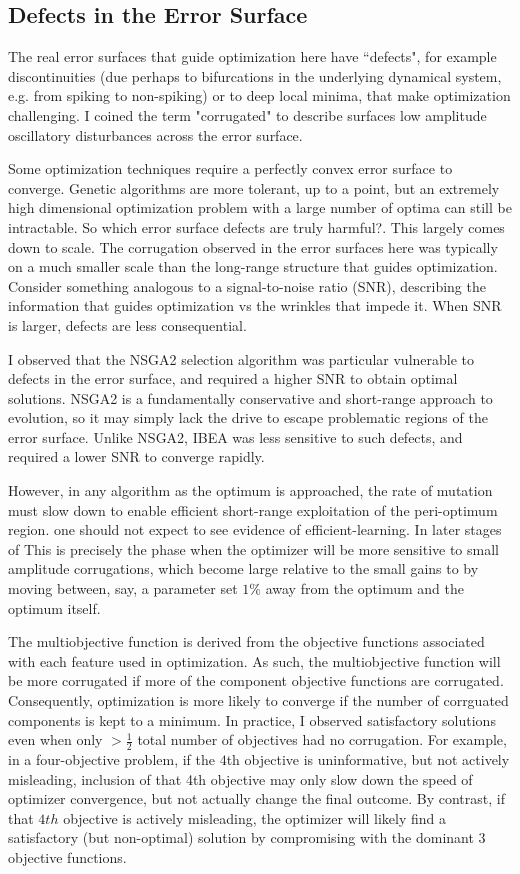 \subsection{Defects in the Error Surface}
The real error surfaces that guide optimization here have ``defects", for example discontinuities (due perhaps to bifurcations in the underlying dynamical system, e.g. from spiking to non-spiking) or to deep local minima, that make optimization challenging.
I coined the term "corrugated" to describe surfaces low amplitude oscillatory disturbances across the error surface.

Some optimization techniques require a perfectly convex error surface to converge.
Genetic algorithms are more tolerant, up to a point, but an extremely high dimensional optimization problem with a large number of optima can still be intractable.
So which error surface defects are truly harmful?.
This largely comes down to scale.
The corrugation observed in the error surfaces here was typically on a much smaller scale than the long-range structure that guides optimization.
Consider something analogous to a signal-to-noise ratio (SNR), describing the information that guides optimization vs the wrinkles that impede it.
When SNR is larger, defects are less consequential.

I observed that the NSGA2 selection algorithm was particular vulnerable to defects in the error surface, and required a higher SNR to obtain optimal solutions.
NSGA2 is a fundamentally conservative and short-range approach to evolution, so it may simply lack the drive to escape problematic regions of the error surface.
Unlike NSGA2, IBEA was less sensitive to such defects, and required a lower SNR to converge rapidly. 

However, in any algorithm as the optimum is approached, the rate of mutation must slow down to enable efficient short-range exploitation of the peri-optimum region.
one should not expect to see evidence of efficient-learning. In later stages of This is precisely the phase when the optimizer will be more sensitive to small amplitude corrugations, which become large relative to the small gains to by moving between, say, a parameter set $1\%$ away from the optimum and the optimum itself.

The multiobjective function is derived from the objective functions associated with each feature used in optimization.
As such, the multiobjective function will be more corrugated if more of the component objective functions are corrugated.
Consequently, optimization is more likely to converge if the number of corrguated components is kept to a minimum.
In practice, I observed satisfactory solutions even when only $>\frac{1}{2}$ total number of objectives had no corrugation.
For example, in a four-objective problem, if the $4$th objective is uninformative, but not actively misleading, inclusion of that 4th objective may only slow down the speed of optimizer convergence, but not actually change the final outcome.
By contrast, if that $4th$ objective is actively misleading, the optimizer will likely find a satisfactory (but non-optimal) solution by compromising with the dominant $3$ objective functions.

